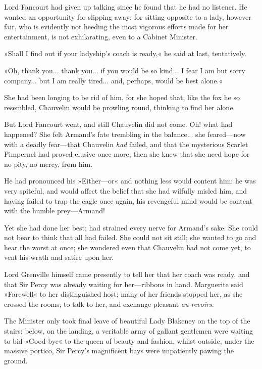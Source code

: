 Lord Fancourt had given up talking since he found that he had no listener. He wanted an opportunity for slipping away: for sitting opposite to a lady, however fair, who is evidently not heeding the most vigorous efforts made for her entertainment, is not exhilarating, even to a Cabinet Minister.

»Shall I find out if your ladyship's coach is ready,« he said at last, tentatively.

»Oh, thank you... thank you... if you would be so kind... I fear I am but sorry company... but I am really tired... and, perhaps, would be best alone.«

She had been longing to be rid of him, for she hoped that, like the fox he so resembled, Chauvelin would be prowling round, thinking to find her alone.

But Lord Fancourt went, and still Chauvelin did not come. Oh! what had happened? She felt Armand's fate trembling in the balance... she feared\allowbreak---\allowbreak now with a deadly fear\allowbreak---\allowbreak that Chauvelin \textit{had} failed, and that the mysterious Scarlet Pimpernel had proved elusive once more; then she knew that she need hope for no pity, no mercy, from him.

He had pronounced his »Either\allowbreak---\allowbreak or\longdash« and nothing less would content him: he was very spiteful, and would affect the belief that she had wilfully misled him, and having failed to trap the eagle once again, his revengeful mind would be content with the humble prey\allowbreak---\allowbreak Armand!

Yet she had done her best; had strained every nerve for Armand's sake. She could not bear to think that all had failed. She could not sit still; she wanted to go and hear the worst at once; she wondered even that Chauvelin had not come yet, to vent his wrath and satire upon her.

Lord Grenville himself came presently to tell her that her coach was ready, and that Sir Percy was already waiting for her\allowbreak---\allowbreak ribbons in hand. Marguerite said »Farewell« to her distinguished host; many of her friends stopped her, as she crossed the rooms, to talk to her, and exchange pleasant \textit{au revoirs}.

The Minister only took final leave of beautiful Lady Blakeney on the top of the stairs; below, on the landing, a veritable army of gallant gentlemen were waiting to bid »Good-bye« to the queen of beauty and fashion, whilst outside, under the massive portico, Sir Percy's magnificent bays were impatiently pawing the ground.

